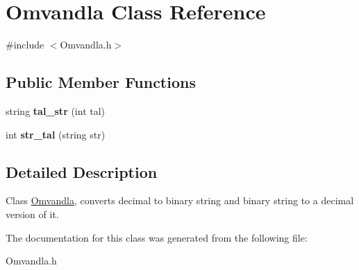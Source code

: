 \hypertarget{class_omvandla}{\section{Omvandla Class Reference}
\label{class_omvandla}
}


{\ttfamily \#include $<$Omvandla.\-h$>$}

\subsection*{Public Member Functions}
\begin{DoxyCompactItemize}
\item 
\hypertarget{class_omvandla_ab326c40cc09a1596dd7bc7a17fd480fe}{string {\bfseries tal\-\_\-str} (int tal)}\label{class_omvandla_ab326c40cc09a1596dd7bc7a17fd480fe}

\item 
\hypertarget{class_omvandla_a72c9d07e3a3b7f49456a6ea22a7689e3}{int {\bfseries str\-\_\-tal} (string str)}\label{class_omvandla_a72c9d07e3a3b7f49456a6ea22a7689e3}

\end{DoxyCompactItemize}


\subsection{Detailed Description}
Class \hyperlink{class_omvandla}{Omvandla}, converts decimal to binary string and binary string to a decimal version of it. 

The documentation for this class was generated from the following file\-:\begin{DoxyCompactItemize}
\item 
Omvandla.\-h\end{DoxyCompactItemize}
